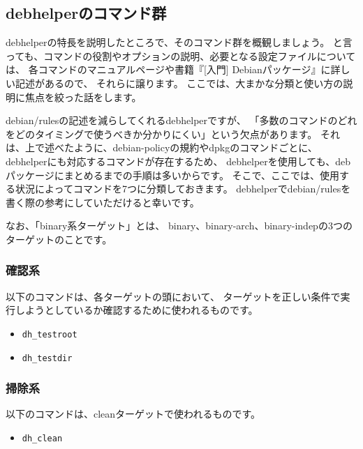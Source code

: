 \documentclass[mingoth,a4paper]{jsarticle}
\begin{document}


\subsection{debhelperのコマンド群}

debhelperの特長を説明したところで、そのコマンド群を概観しましょう。
と言っても、コマンドの役割やオプションの説明、必要となる設定ファイルについては、
各コマンドのマニュアルページや書籍『[入門] Debianパッケージ』に詳しい記述があるので、
それらに譲ります。
ここでは、大まかな分類と使い方の説明に焦点を絞った話をします。

debian/rulesの記述を減らしてくれるdebhelperですが、
「多数のコマンドのどれをどのタイミングで使うべきか分かりにくい」という欠点があります。
それは、上で述べたように、debian-policyの規約やdpkgのコマンドごとに、
debhelperにも対応するコマンドが存在するため、
debhelperを使用しても、debパッケージにまとめるまでの手順は多いからです。
そこで、ここでは、使用する状況によってコマンドを7つに分類しておきます。
debhelperでdebian/rulesを書く際の参考にしていただけると幸いです。

なお、「binary系ターゲット」とは、
binary、binary-arch、binary-indepの3つのターゲットのことです。

\subsubsection{確認系}

以下のコマンドは、各ターゲットの頭において、
ターゲットを正しい条件で実行しようとしているか確認するために使われるものです。

\begin{itemize}
 \item \texttt{dh\_testroot}
 \item \texttt{dh\_testdir}
\end{itemize}

\subsubsection{掃除系}

以下のコマンドは、cleanターゲットで使われるものです。

\begin{itemize}
 \item \texttt{dh\_clean}
\end{itemize}
\end{document}
